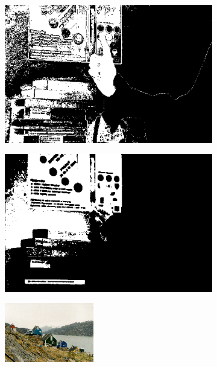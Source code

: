 \begin{figure}[h]
\begin{subfigure}[b]{0.18\textwidth}
     \end{subfigure}
    \hfill
     \begin{subfigure}[b]{0.18\textwidth}
         \centering
         \includegraphics[width=\textwidth]{images/results/base/1_A_hgr2A2_id01_1_bayes.png}
     \end{subfigure}
    \hfill
     \begin{subfigure}[b]{0.18\textwidth}
         \centering
         \includegraphics[width=\textwidth]{images/results/base/1_A_hgr2A2_id01_1_dyc.png}
     \end{subfigure}
     \begin{subfigure}[b]{0.18\textwidth}
         \centering
         \includegraphics[width=\textwidth]{images/results/base/greenland.205.color.d3_x.png}

\end{subfigure}
\end{figure}
